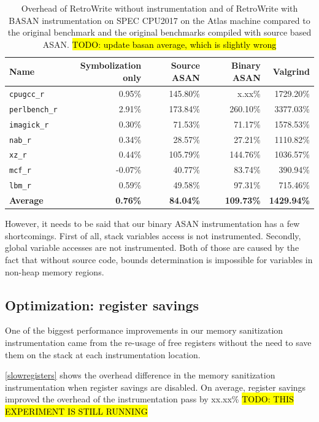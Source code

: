 \documentclass[a4paper,11pt,oneside]{report}
\newcommand{\sysname}{RetroWrite\xspace}
\DeclareRobustCommand{\todo}[1]{{\sethlcolor{cyan}\hl{TODO: #1}}}
\begin{document}
\begin{table}
\centering
\begin{tabular}{lrrrr}
\toprule
	\textbf{Name} \hspace{4em} &\textbf{Symbolization only} & \textbf{Source ASAN} & \textbf{Binary ASAN} & \textbf{Valgrind} \\
\toprule

	\texttt{cpugcc\_r   } & 0.95\% &145.80\% & x.xx\% & 1729.20\% \\
	\texttt{perlbench\_r} & 2.91\% &173.84\% &260.10\% &3377.03\% \\
	\texttt{imagick\_r}   & 0.30\% & 71.53\% & 71.17\% &1578.53\% \\
	\texttt{nab\_r      } & 0.34\% & 28.57\% & 27.21\% &1110.82\% \\
	\texttt{xz\_r   }     & 0.44\% &105.79\% &144.76\% &1036.57\% \\
	\texttt{mcf\_r      } &-0.07\% & 40.77\% & 83.74\% & 390.94\% \\
	\texttt{lbm\_r      } & 0.59\% & 49.58\% & 97.31\% & 715.46\% \\
	\midrule
	\textbf{Average} & \textbf{0.76\%} & \textbf{84.04\%} & \textbf{109.73\%} & \textbf{1429.94\%} \\
\bottomrule
\end{tabular}
\caption{Overhead of \sysname without instrumentation and of \sysname with
BASAN instrumentation on SPEC CPU2017 on the Atlas machine compared to the original benchmark
and the original benchmarks compiled with source based ASAN.
\todo{update basan average, which is slightly wrong} } 
\label{labellatabella}
\end{table}


However, it needs to be said that our binary ASAN instrumentation has a few
shortcomings. First of all, stack variables access is not instrumented.
Secondly, global variable accesses are not instrumented. Both of those are
caused by the fact that without source code, bounds determination is impossible
for variables in non-heap memory regions. 


\subsection{Optimization: register savings}
One of the biggest performance improvements in our memory sanitization instrumentation 
came from the re-usage of free registers without the need to save them on the stack
at each instrumentation location. 

\autoref{slowregisters} shows the overhead difference in the memory sanitization instrumentation
when register savings are disabled. On average, register savings improved the overhead of
the instrumentation pass by xx.xx\% \todo{THIS EXPERIMENT IS STILL RUNNING}
\end{document}
